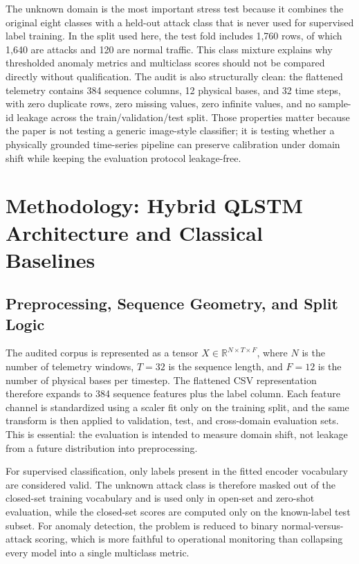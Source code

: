 The unknown domain is the most important stress test because it combines the original eight classes with a held-out attack class that is never used for supervised label training. In the split used here, the test fold includes 1,760 rows, of which 1,640 are attacks and 120 are normal traffic. This class mixture explains why thresholded anomaly metrics and multiclass scores should not be compared directly without qualification. The audit is also structurally clean: the flattened telemetry contains 384 sequence columns, 12 physical bases, and 32 time steps, with zero duplicate rows, zero missing values, zero infinite values, and no sample-id leakage across the train/validation/test split. Those properties matter because the paper is not testing a generic image-style classifier; it is testing whether a physically grounded time-series pipeline can preserve calibration under domain shift while keeping the evaluation protocol leakage-free.
\section{Methodology: Hybrid QLSTM Architecture and Classical Baselines}
\subsection{Preprocessing, Sequence Geometry, and Split Logic}
The audited corpus is represented as a tensor $X \in \mathbb{R}^{N \times T \times F}$, where $N$ is the number of telemetry windows, $T=32$ is the sequence length, and $F=12$ is the number of physical bases per timestep. The flattened CSV representation therefore expands to 384 sequence features plus the label column. Each feature channel is standardized using a scaler fit only on the training split, and the same transform is then applied to validation, test, and cross-domain evaluation sets. This is essential: the evaluation is intended to measure domain shift, not leakage from a future distribution into preprocessing.

For supervised classification, only labels present in the fitted encoder vocabulary are considered valid. The unknown attack class is therefore masked out of the closed-set training vocabulary and is used only in open-set and zero-shot evaluation, while the closed-set scores are computed only on the known-label test subset. For anomaly detection, the problem is reduced to binary normal-versus-attack scoring, which is more faithful to operational monitoring than collapsing every model into a single multiclass metric.

